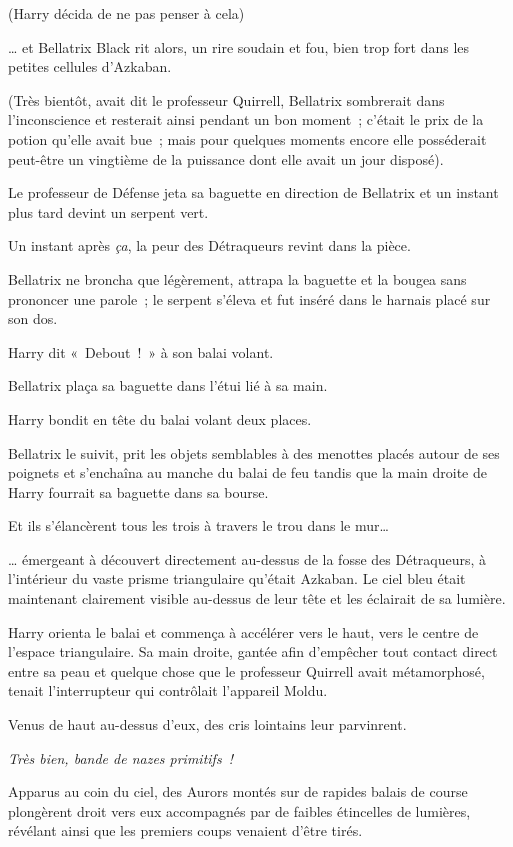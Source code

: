 (Harry décida de ne pas penser à cela)

… et Bellatrix Black rit alors, un rire soudain et fou, bien trop fort dans les petites cellules d'Azkaban.

(Très bientôt, avait dit le professeur Quirrell, Bellatrix sombrerait dans l'inconscience et resterait ainsi pendant un bon moment~; c'était le prix de la potion qu'elle avait bue~; mais pour quelques moments encore elle posséderait peut-être un vingtième de la puissance dont elle avait un jour disposé).

Le professeur de Défense jeta sa baguette en direction de Bellatrix et un instant plus tard devint un serpent vert.

Un instant après \emph{ça}, la peur des Détraqueurs revint dans la pièce.

Bellatrix ne broncha que légèrement, attrapa la baguette et la bougea sans prononcer une parole~; le serpent s'éleva et fut inséré dans le harnais placé sur son dos.

Harry dit «~Debout~!~»
à son balai volant.

Bellatrix plaça sa baguette dans l'étui lié à sa main.

Harry bondit en tête du balai volant deux places.

Bellatrix le suivit, prit les objets semblables à des menottes placés autour de ses poignets et s'enchaîna au manche du balai de feu tandis que la main droite de Harry fourrait sa baguette dans sa bourse.

Et ils s'élancèrent tous les trois à travers le trou dans le mur…

… émergeant à découvert directement au-dessus de la fosse des Détraqueurs, à l'intérieur du vaste prisme triangulaire qu'était Azkaban.
Le ciel bleu était maintenant clairement visible au-dessus de leur tête et les éclairait de sa lumière.

Harry orienta le balai et commença à accélérer vers le haut, vers le centre de l'espace triangulaire.
Sa main droite, gantée afin d'empêcher tout contact direct entre sa peau et quelque chose que le professeur Quirrell avait métamorphosé, tenait l'interrupteur qui contrôlait l'appareil Moldu.

Venus de haut au-dessus d'eux, des cris lointains leur parvinrent.

\emph{Très bien, bande de nazes primitifs~!}

Apparus au coin du ciel, des Aurors montés sur de rapides balais de course plongèrent droit vers eux accompagnés par de faibles étincelles de lumières, révélant ainsi que les premiers coups venaient d'être tirés.

